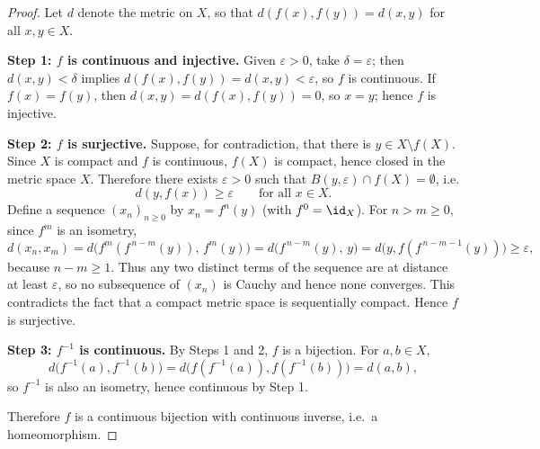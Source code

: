 
\begin{proof}
Let $d$ denote the metric on $X$, so that $d(f(x),f(y))=d(x,y)$ for all $x,y\in X$.

\textbf{Step 1: $f$ is continuous and injective.} Given $\varepsilon>0$, take $\delta=\varepsilon$;
then $d(x,y)<\delta$ implies $d(f(x),f(y))=d(x,y)<\varepsilon$, so $f$ is continuous. If
$f(x)=f(y)$, then $d(x,y)=d(f(x),f(y))=0$, so $x=y$; hence $f$ is injective.

\textbf{Step 2: $f$ is surjective.} Suppose, for contradiction, that there is $y\in X\setminus f(X)$.
Since $X$ is compact and $f$ is continuous, $f(X)$ is compact, hence closed in the metric space
$X$. Therefore there exists $\varepsilon>0$ such that $B(y,\varepsilon)\cap f(X)=\emptyset$, i.e.
\[ d(y,f(x))\ge\varepsilon\qquad\text{for all } x\in X. \]
Define a sequence $(x_n)_{n\ge0}$ by $x_n=f^n(y)$ (with $f^0=\id_X$). For $n>m\ge0$, since $f^m$
is an isometry,
\[ d(x_n,x_m)=d\bigl(f^m(f^{\,n-m}(y)),\,f^m(y)\bigr)=d\bigl(f^{\,n-m}(y),\,y\bigr)
   =d\bigl(y,f(f^{\,n-m-1}(y))\bigr)\ge\varepsilon, \]
because $n-m\ge1$. Thus any two distinct terms of the sequence are at distance at least
$\varepsilon$, so no subsequence of $(x_n)$ is Cauchy and hence none converges. This contradicts
the fact that a compact metric space is sequentially compact. Hence $f$ is surjective.

\textbf{Step 3: $f^{-1}$ is continuous.} By Steps 1 and 2, $f$ is a bijection. For $a,b\in X$,
\[ d\bigl(f^{-1}(a),f^{-1}(b)\bigr)=d\bigl(f(f^{-1}(a)),f(f^{-1}(b))\bigr)=d(a,b), \]
so $f^{-1}$ is also an isometry, hence continuous by Step 1.

Therefore $f$ is a continuous bijection with continuous inverse, i.e.\ a homeomorphism.
\end{proof}
